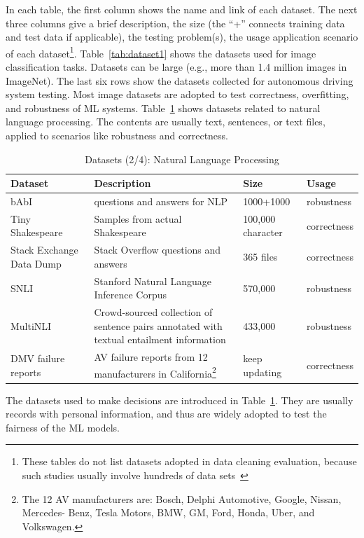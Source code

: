 In each table, the first column shows the name and link of each dataset.
The next three columns give a brief description, the size (the ``+'' connects training data and test data if applicable), the testing problem(s), the usage application scenario of each dataset\footnote{These tables do not list datasets adopted in data cleaning evaluation, because such studies usually involve hundreds of data sets~}.
Table~\ref{tab:dataset1} shows the datasets used for image classification tasks.
Datasets can be large (e.g., more than 1.4 million images in ImageNet).
The last six rows show the datasets collected for autonomous driving system testing.
Most image datasets are adopted to test correctness, overfitting, and robustness of ML systems.
Table~\ref{tab:dataset3} shows datasets related to natural language processing. 
The contents are usually text, sentences, or text files, applied to scenarios like robustness and correctness.
\begin{table}[h!]\small
	\center
	\caption{\label{tab:dataset3}Datasets (2/4): Natural Language Processing}
	\begin{tabular}{p{3.9cm}|  p{7.5cm}| p{2cm}| p{2.9cm}}
		\toprule
		\textbf{Dataset}&\textbf{Description}&\textbf{Size}&\textbf{Usage}\\ \midrule 
			bAbI~&questions and answers for NLP&1000+1000&robustness\\ \midrule
			Tiny Shakespeare~&Samples from actual Shakespeare&100,000 character&correctness\\  \midrule
		Stack Exchange Data Dump~&Stack Overflow questions and answers&365 files&correctness\\ \midrule
		SNLI~&Stanford Natural Language Inference Corpus&570,000&robustness\\ \midrule
		MultiNLI~& Crowd-sourced collection of sentence pairs annotated with textual entailment information&433,000&robustness\\  \midrule
		DMV failure reports~&AV failure reports from 12 manufacturers in California\footnote{The 12 AV manufacturers are: Bosch, Delphi Automotive, Google, Nissan, Mercedes- Benz, Tesla Motors, BMW, GM, Ford, Honda, Uber, and Volkswagen.} &keep  updating&correctness \\
		\bottomrule		
	\end{tabular}
\end{table}
The datasets used to make decisions are introduced in Table~\ref{tab:dataset3}.
They are usually records with personal information, and thus are widely adopted to test the fairness of the ML models.
